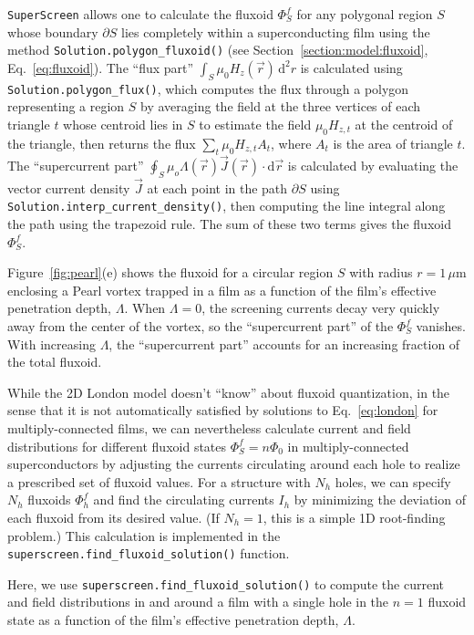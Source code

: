 \documentclass[final,3p,times]{elsarticle}
\newcommand{\inline}[1]{\texttt{#1}\xspace}
\newcommand{\SuperScreen}{\inline{SuperScreen}}
\begin{document}
\SuperScreen allows one to calculate the fluxoid $\Phi^f_S$ for any polygonal region $S$ whose boundary $\partial S$ lies completely within a superconducting film using the method \inline{Solution.polygon_fluxoid()} (see Section~\ref{section:model:fluxoid}, Eq.~\ref{eq:fluxoid}). The ``flux part''  $\int_S\mu_0H_z(\vec{r})\,\mathrm{d}^2r$ is calculated using \inline{Solution.polygon_flux()}, which computes the flux through a polygon representing a region $S$ by averaging the field at the three vertices of each triangle $t$ whose centroid lies in $S$ to estimate the field $\mu_0H_{z, t}$ at the centroid of the triangle, then returns the flux $\sum_t \mu_0H_{z,t}A_t$, where $A_t$ is the area of triangle $t$. The ``supercurrent part'' $\oint_S\mu_o\Lambda(\vec{r})\vec{J}(\vec{r})\cdot\mathrm{d}\vec{r}$ is calculated by evaluating the vector current density $\vec{J}$ at each point in the path $\partial S$ using \inline{Solution.interp_current_density()}, then computing the line integral along the path using the trapezoid rule. The sum of these two terms gives the fluxoid $\Phi^f_S$.

Figure~\ref{fig:pearl}(e) shows the fluxoid for a circular region $S$ with radius $r=1\,\mu\mathrm{m}$ enclosing a Pearl vortex trapped in a film as a function of the film's effective penetration depth, $\Lambda$. When $\Lambda=0$, the screening currents decay very quickly away from the center of the vortex, so the ``supercurrent part'' of the $\Phi^f_S$ vanishes. With increasing $\Lambda$, the ``supercurrent part'' accounts for an increasing fraction of the total fluxoid.

While the 2D London model doesn't ``know'' about fluxoid quantization, in the sense that it is not automatically satisfied by solutions to Eq.~\ref{eq:london} for multiply-connected films, we can nevertheless calculate current and field distributions for different fluxoid states $\Phi^f_S=n\Phi_0$ in multiply-connected superconductors by adjusting the currents circulating around each hole to realize a prescribed set of fluxoid values. For a structure with $N_h$ holes, we can specify $N_h$ fluxoids $\Phi^f_h$ and find the circulating currents $I_h$ by minimizing the deviation of each fluxoid from its desired value. (If $N_h=1$, this is a simple 1D root-finding problem.) This calculation is implemented in the \inline{superscreen.find_fluxoid_solution()} function.

Here, we use \inline{superscreen.find_fluxoid_solution()} to compute the current and field distributions in and around a film with a single hole in the $n=1$ fluxoid state as a function of the film's effective penetration depth, $\Lambda$.
\end{document}
